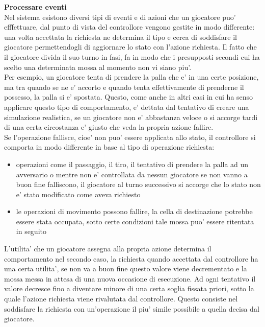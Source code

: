 \textbf{Processare eventi}\\

Nel sistema esistono diversi tipi di eventi e di azioni che un giocatore puo' efffettuare, dal punto di vista del controllore vengono gestite in modo differente: una volta accettata la richiesta ne determina il tipo e cerca di soddisfare il giocatore permettendogli di aggiornare lo stato con l'azione richiesta. Il fatto che il giocatore divida il suo turno in fasi, fa in modo che i presupposti secondi cui ha scelto una determinata mossa al momento non vi siano piu'.\\

Per esempio, un giocatore tenta di prendere la palla che e' in una certe posizione, ma tra quando se ne e' accorto e quando tenta effettivamente di prenderne il possesso, la palla si e' spostata. Questo, come anche in altri casi in cui ha senso applicare questo tipo di comportamento, e' dettata dal tentativo di creare una simulazione realistica, se un giocatore non e' abbastanza veloce o si accorge tardi di una certa circostanza e' giusto che veda la propria azione fallire.\\

Se l'operazione fallisce, cioe' non puo' essere applicata allo stato, il controllore si comporta in modo differente in base al tipo di operazione richiesta:

\begin{itemize}
	\item operazioni come il passaggio, il tiro, il tentativo di prendere la palla ad un avversario o mentre non e' controllata da nessun giocatore se non vanno a buon fine falliscono, il giocatore al turno successivo si accorge che lo stato non e' stato modificato come aveva richiesto
	\item le operazioni di movimento possono fallire, la cella di destinazione potrebbe essere stata occupata, sotto certe condizioni tale mossa puo' essere ritentata in seguito
\end{itemize}

L'utilita' che un giocatore assegna alla propria azione determina il comportamento nel secondo caso, la richiesta quando accettata dal controllore ha una certa utilita', se non va a buon fine questo valore viene decrementato e la mossa messa in attesa di una nuova occasione di esecuzione. Ad ogni tentativo il valore decresce fino a diventare minore di una certa soglia fissata priori, sotto la quale l'azione richiesta viene rivalutata dal controllore. Questo consiste nel soddisfare la richiesta con un'operazione il piu' simile possibile a quella decisa dal giocatore.\\

